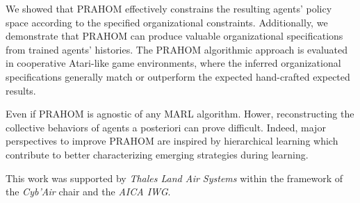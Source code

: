 \documentclass{ecai}
\newcounter{proof}
\begin{document}
We showed that PRAHOM effectively constrains the resulting agents' policy space according to the specified organizational constraints. Additionally, we demonstrate that PRAHOM can produce valuable organizational specifications from trained agents' histories. The PRAHOM algorithmic approach is evaluated in cooperative Atari-like game environments, where the inferred organizational specifications generally match or outperform the expected hand-crafted expected results.

Even if PRAHOM is agnostic of any MARL algorithm. Hower, reconstructing the collective behaviors of agents a posteriori can prove difficult. Indeed, major perspectives to improve PRAHOM are inspired by hierarchical learning which contribute to better characterizing emerging strategies during learning.




\begin{ack}
    This work was supported by \emph{Thales Land Air Systems} within the framework of the \emph{Cyb'Air} chair and the \emph{AICA IWG}.
\end{ack}


\newpage






% 
\end{document}
